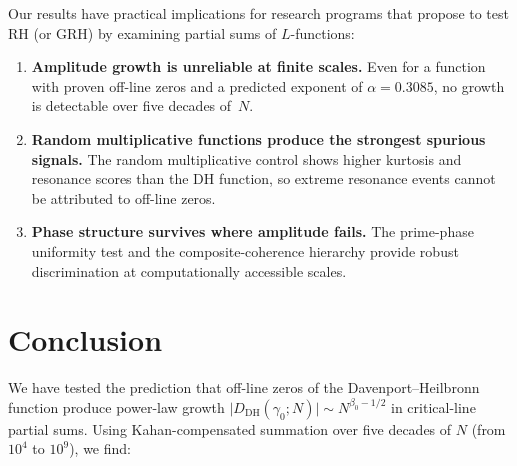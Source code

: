 \documentclass[11pt]{amsart}
\theoremstyle{definition}
\theoremstyle{remark}
\renewcommand{\DH}{\mathrm{DH}}
\newcommand{\abs}[1]{\lvert #1 \rvert}
\begin{document}
Our results have practical implications for research programs that
propose to test RH (or GRH) by examining partial sums of
$L$-functions:

\begin{enumerate}
\item \textbf{Amplitude growth is unreliable at finite scales.}  Even
  for a function with proven off-line zeros and a predicted exponent
  of $\alpha = 0.3085$, no growth is detectable over five decades
  of~$N$.

\item \textbf{Random multiplicative functions produce the strongest
  spurious signals.}  The random multiplicative control shows higher
  kurtosis and resonance scores than the DH function, so extreme
  resonance events cannot be attributed to off-line zeros.

\item \textbf{Phase structure survives where amplitude fails.}  The
  prime-phase uniformity test and the composite-coherence hierarchy
  provide robust discrimination at computationally accessible scales.
\end{enumerate}

\section{Conclusion}\label{sec:conclusion}

We have tested the prediction that off-line zeros of the
Davenport--Heilbronn function produce power-law growth
$\abs{D_{\DH}(\gamma_0; N)} \sim N^{\beta_0 - 1/2}$ in critical-line
partial sums.  Using Kahan-compensated summation over five decades of
$N$ (from $10^4$ to $10^9$), we find:
\end{document}
